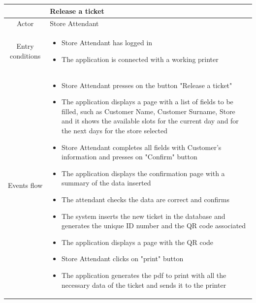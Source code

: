\documentclass[table, 12pt]{article}
\begin{document}
\begin{longtable}{|c| p{10cm}|}
    \hline
                     & Release a ticket                                                                                                                                             \\
    \hline
    Actor            & Store Attendant                                                                                                                                              \\
    \hline
    Entry conditions & \begin{itemize}
        \item Store Attendant has logged in
        \item The application is connected with a working printer
    \end{itemize}                                                                                                                                   \\
    \hline
    Events flow      & \begin{itemize}[nosep,after=\strut]
        \item Store Attendant presses on the button "Release a ticket"
        \item The application displays a page with a list of fields to be filled, such as Customer Name, Customer Surname, Store and it shows the available slots for the current day and for the next days for the store selected
        \item Store Attendant completes all fields with Customer's information and presses on "Confirm" button
        \item The application displays the confirmation page with a summary of the data inserted
        \item The attendant checks the data are correct and confirms
        \item The system inserts the new ticket in the database and generates the unique ID number and the QR code associated
        \item The application displays a page with the QR code
        \item Store Attendant clicks on "print" button
        \item The application generates the pdf to print with all the necessary data of the ticket and sends it to the printer
    \end{itemize}                                                                                                                                   \\

\end{longtable}
\end{document}
